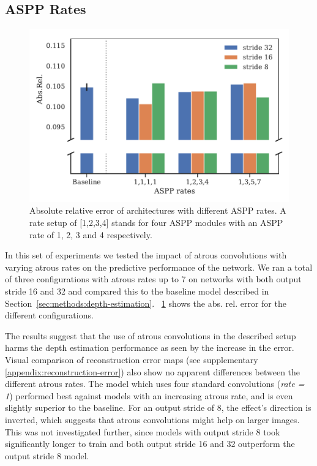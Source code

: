 \subsection{ASPP Rates}
\label{section:aspp-rates}
\begin{figure}[t]
    \begin{center}
       \includegraphics[width=1.0\linewidth]{images/figures/experiment1_AbsRel_os8.pdf}
    \end{center}
   \caption{Absolute relative error of architectures with different ASPP rates. A rate setup of [1,2,3,4] stands for four ASPP modules with an ASPP rate of 1, 2, 3 and 4 respectively.}
\label{fig:aspp-rates}
\end{figure}

In this set of experiments we tested the impact of atrous convolutions with varying atrous rates on the predictive performance of the network. We ran a total of three configurations with atrous rates up to 7 on networks with both output stride 16 and 32 and compared this to the baseline model described in Section~\ref{sec:methods:depth-estimation}.
\figurename~\ref{fig:aspp-rates} shows the abs. rel. error for the different configurations. 

The results suggest that the use of atrous convolutions in the described setup harms the depth estimation performance as seen by the increase in the error. Visual comparison of reconstruction error maps (see supplementary \ref{appendix:reconstruction-error}) also show no apparent differences between the different atrous rates. The model which uses four standard convolutions (\textit{rate = 1}) performed best against models with an increasing atrous rate, and is even slightly superior to the baseline.
For an output stride of 8, the effect's direction is inverted, which suggests that atrous convolutions might help on larger images. This was not investigated further, since models with output stride 8 took significantly longer to train and both output stride 16 and 32 outperform the output stride 8 model. 

